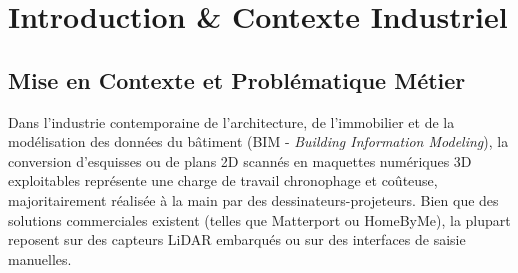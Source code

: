 \documentclass[11pt,a4paper]{report}
\begin{document}
\begin{abstract}
Ce projet présente \textbf{ArchiGen 3D}, un système complet de Computer Vision et d'Intelligence Artificielle Générative dédié à la conversion automatisée de plans 2D d'architectes en environnements 3D interactifs avec textures de façades synthétisées. Le système s'articule autour de deux axes fondamentaux : premièrement, une architecture multi-tâches UNet++ (ResNet-34) entraînée sur CubiCasa5K (4\,200 plans d'entraînement, 400 de test, licence CC BY-NC 4.0) assurant la segmentation conjointe des cloisons structurelles (murs intérieurs et extérieurs, portes, fenêtres) et des pièces fonctionnelles (11 classes sémantiques), suivie d'une vectorisation géométrique rectilinéaire et d'une extrusion 3D étanche. Deuxièmement, un modèle génératif antagoniste conditionnel (cGAN / Pix2Pix) stabilisé par normalisation spectrale, perte perceptuelle LPIPS (SqueezeNet) et matching de caractéristiques multi-échelles, synthétisant des textures de façades sur le jeu de données CMP Facades (400 paires train, 106 test). L'intégralité du cycle de vie respecte les standards MLOps les plus stricts : versioning des données et poids par DVC, observabilité complète via MLflow, moteur d'inférence accéléré sous ONNX Runtime avec parité numérique stricte ($\Delta_{\max} = 6.31 \times 10^{-6}$), conteneurisation Docker Compose multi-services avec proxy inverse Nginx, et pipeline CI/CD automatisé sous GitHub Actions validé par 25 tests Pytest.
\end{abstract}

\tableofcontents
\newpage

\chapter{Introduction \& Contexte Industriel}

\section{Mise en Contexte et Problématique Métier}
Dans l'industrie contemporaine de l'architecture, de l'immobilier et de la modélisation des données du bâtiment (BIM - \emph{Building Information Modeling}), la conversion d'esquisses ou de plans 2D scannés en maquettes numériques 3D exploitables représente une charge de travail chronophage et coûteuse, majoritairement réalisée à la main par des dessinateurs-projeteurs. Bien que des solutions commerciales existent (telles que Matterport ou HomeByMe), la plupart reposent sur des capteurs LiDAR embarqués ou sur des interfaces de saisie manuelles.
\end{document}
